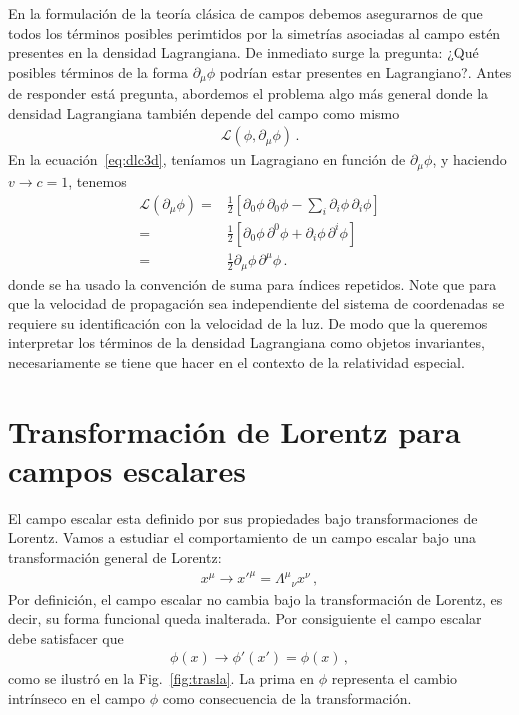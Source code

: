 En la formulación de la teoría clásica de campos debemos asegurarnos de que todos los términos posibles perimtidos por la simetrías asociadas al campo estén presentes en la densidad Lagrangiana. De inmediato surge la pregunta: ¿Qué posibles términos de la forma $\partial_{\mu}\phi$ podrían estar presentes en Lagrangiano?. Antes de responder está pregunta, abordemos el problema algo más general donde la densidad Lagrangiana también depende del campo como mismo
\begin{align*}
  \mathcal{L}(\phi,\partial_\mu \phi)\,.
\end{align*}
En la ecuación~\eqref{eq:dlc3d}, teníamos un Lagragiano en función de $\partial_{\mu}\phi$, y haciendo $v\to c=1$, tenemos
\begin{align}
\label{eq:Lpr}
  \mathcal{L}(\partial_{\mu}\phi)
    =&\frac{1}{2}\left[
      {\partial_0\phi}\,{\partial_0\phi}-\sum_i{\partial_i\phi}\,{\partial_i\phi}
   \right]\nonumber\\
    =&\frac{1}{2}\left[
      {\partial_0\phi}\,{\partial^0\phi}+{\partial_i\phi}\,{\partial^i\phi}
   \right]\nonumber\\
   =&\frac{1}{2}{\partial_\mu\phi}\,{\partial^\mu\phi}\,.
\end{align}
donde se ha usado la convención de suma para índices repetidos. Note que para que la velocidad de propagación sea independiente del sistema de coordenadas se requiere su identificación con la velocidad de la luz. De modo que la queremos interpretar los términos de la densidad Lagrangiana como objetos invariantes, necesariamente se tiene que hacer en el contexto de la relatividad especial.


\section{Transformación de Lorentz para campos escalares}

El campo escalar esta definido por sus propiedades bajo transformaciones de Lorentz. Vamos a estudiar el comportamiento de un campo escalar bajo una transformación general de Lorentz:
\begin{align}
\label{eq:179qft}
  x^\mu\to {x'}^\mu={\Lambda^\mu}_\nu x^\nu\,,
\end{align}
Por definición, el campo escalar no cambia bajo la transformación de Lorentz, es decir, su forma funcional queda inalterada. Por consiguiente el campo escalar debe satisfacer que
\begin{align}
 \phi(x)\to  \phi'(x')=\phi(x)\,,
\end{align}
como se ilustró en la Fig.~\ref{fig:trasla}. La prima en $\phi$ representa el cambio intrínseco en el campo $\phi$ como consecuencia de la transformación.


